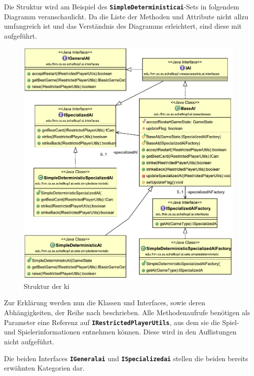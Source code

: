 \documentclass[
							a4paper, 
							11pt, 
							openany, 
							liststotoc,
							parskip=half, 
   							headings=normal
						]{scrreprt}
\begin{document}
{\clearpage

Die Struktur wird am Beispiel des \textbf{\texttt{SimpleDeterministic\acs{ai}}}-Sets in folgendem Diagramm veranschaulicht. Da die Liste der Methoden und Attribute nicht allzu umfangreich ist und das Verständnis des Diagramms erleichtert, sind diese mit aufgeführt.

\begin{figure}[H]
\begin{center}
    \includegraphics[width=1.0\textwidth]{./pictures/uml/class_diagram/uml_class_ai.pdf}
	\caption[Anwendung/\acs{ki} -- Struktur der \acs{ki} am Beispiel]{Struktur der \acs{ki}} \label{fig:ai}
\end{center}
\end{figure}

Zur Erklärung werden nun die Klassen und Interfaces, sowie deren Abhängigkeiten, der Reihe nach beschrieben. Alle Methodenaufrufe benötigen als Parameter eine Referenz auf \textbf{\texttt{IRestrictedPlayerUtils}}, aus dem sie die Spiel- und Spielerinformationen entnehmen können. Diese wird in den Auflistungen nicht aufgeführt.

Die beiden Interfaces \textbf{\texttt{IGeneral\acs{ai}}} und \textbf{\texttt{ISpecialized\acs{ai}}} stellen die beiden bereits er\-wähn\-ten Kategorien dar.

}
\end{document}
